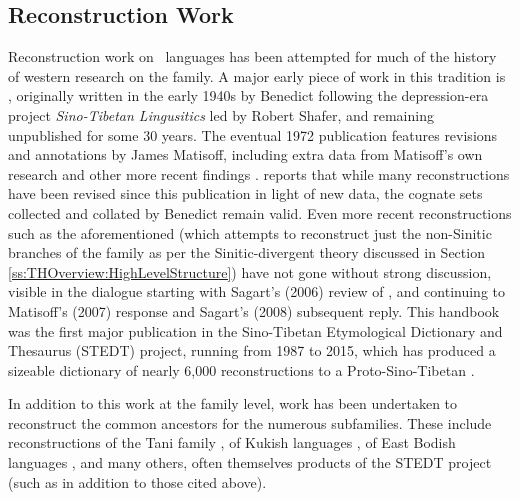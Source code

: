\subsection{Reconstruction Work}
Reconstruction work on \lfam\ languages has been attempted for much of the history of western research on the family. A major early piece of work in this tradition is , originally written in the early 1940s by Benedict following the depression-era project \textit{Sino-Tibetan Lingusitics} led by Robert Shafer, and remaining unpublished for some 30 years. The eventual 1972 publication features revisions and annotations by James Matisoff, including extra data from Matisoff's own research and other more recent findings \cite{Matisoff2003}.  reports that while many reconstructions have been revised since this publication in light of new data, the cognate sets collected and collated by Benedict remain valid. Even more recent reconstructions such as the aforementioned  (which attempts to reconstruct just the non-Sinitic branches of the family as per the Sinitic-divergent theory discussed in Section \ref{ss:THOverview:HighLevelStructure}) have not gone without strong discussion, visible in the dialogue starting with Sagart's (2006) \nocite{Sagart2006} review of , and continuing to Matisoff's (2007) \nocite{Matisoff2007} response and Sagart's (2008) \nocite{Sagart2008} subsequent reply. This handbook was the first major publication in the Sino-Tibetan Etymological Dictionary and Thesaurus (STEDT) project, running from 1987 to 2015, which has produced a sizeable dictionary of nearly 6,000 reconstructions to a Proto-Sino-Tibetan \cite{STEDT}.

In addition to this work at the family level, work has been undertaken to reconstruct the common ancestors for the numerous subfamilies. These include reconstructions of the Tani family \cite{Sun1993}, of Kukish languages \cite{VanBik2009}, of East Bodish languages \cite{Hyslop2014a}, and many others, often themselves products of the STEDT project (such as  in addition to those cited above).

